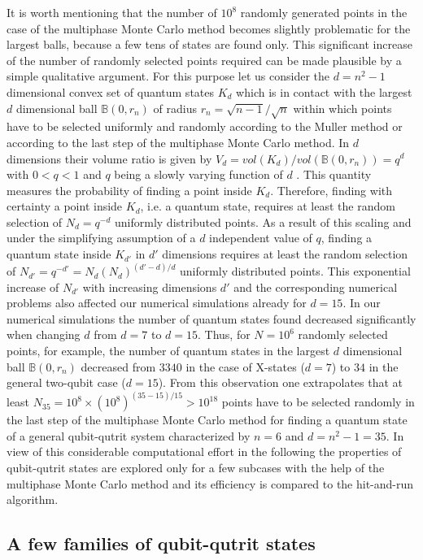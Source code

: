 \documentclass[12pt]{iopart}
\begin{document}
It is worth mentioning that the number of $10^8$ randomly generated points in the case of the multiphase Monte Carlo method becomes slightly problematic for the largest balls, because a few tens of states are found only.
This significant increase of the number of randomly selected points required can be made plausible by a simple qualitative argument. For this purpose let us consider the $d=n^2-1$ dimensional 
convex set of quantum states $K_d$ which is in contact with the largest $d$ dimensional ball $\mathbb{B}(0,r_n)$ of radius $r_n =\sqrt{n-1}/\sqrt{n}$  within which points have to be selected uniformly 
and randomly according to the Muller method or according to the last step of the multiphase Monte Carlo method. In $d$ dimensions their volume ratio is given by
$V_{d} = vol(K_d)/vol(\mathbb{B}(0,r_n))=q^d$ with $0 < q < 1$ and $q$  being a slowly varying function of $d$  \cite{Sim03}. This quantity measures the probability of finding  a point inside $K_d$. Therefore, 
finding with certainty a point inside $K_d$, i.e. a quantum state, requires at least the random selection of $N_d = q^{-d}$ uniformly distributed points. As a result of this scaling and under the 
simplifying assumption of a $d$ independent value of $q$, finding a quantum state
inside $K_{d'}$ in $d'$ dimensions  requires at least the random selection of $N_{d'} = q^{-d'} = N_d (N_d)^{(d'-d)/d}$
uniformly distributed points. This exponential increase of $N_{d'}$ with increasing dimensions $d'$ and the corresponding numerical problems also affected our numerical simulations already for $d=15$.
In our numerical simulations the number of quantum states found decreased significantly when
changing $d$ from $d=7$ to $d=15$. Thus, for $N=10^6$ randomly selected points, for example, the number of quantum states in the largest $d$ dimensional ball $\mathbb{B}(0,r_n)$ decreased from $3340$ 
in the case of X-states ($d=7$) to $34$ in the general two-qubit case ($d=15$).  From this observation one extrapolates that at 
least $N_{35} = 10^8\times (10^8)^{(35-15)/15} > 10^{18}$ points have to be selected randomly in the last step of the multiphase Monte Carlo method for finding a quantum 
state of a general qubit-qutrit system characterized by $n=6$ and $d=n^2 - 1 = 35$. In view of this considerable computational effort in the following the properties of qubit-qutrit states are explored 
only for a few subcases with the help of the multiphase Monte Carlo method and its efficiency is compared to the hit-and-run algorithm.


\subsection{A few families of qubit-qutrit states}
\label{sec:qbqtspec}
\end{document}
